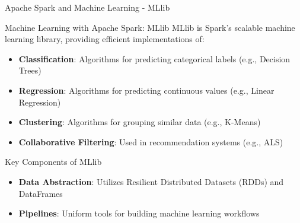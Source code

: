 \documentclass[aspectratio=169]{beamer}
\begin{document}
\begin{frame}[fragile]{Apache Spark and Machine Learning - MLlib}
    \begin{block}{Machine Learning with Apache Spark: MLlib}
        MLlib is Spark's scalable machine learning library, providing efficient implementations of:
        \begin{itemize}
            \item \textbf{Classification}: Algorithms for predicting categorical labels (e.g., Decision Trees)
            \item \textbf{Regression}: Algorithms for predicting continuous values (e.g., Linear Regression)
            \item \textbf{Clustering}: Algorithms for grouping similar data (e.g., K-Means)
            \item \textbf{Collaborative Filtering}: Used in recommendation systems (e.g., ALS)
        \end{itemize}
    \end{block}
    \begin{block}{Key Components of MLlib}
        \begin{itemize}
            \item \textbf{Data Abstraction}: Utilizes Resilient Distributed Datasets (RDDs) and DataFrames
            \item \textbf{Pipelines}: Uniform tools for building machine learning workflows
        \end{itemize}
    \end{block}
\end{frame}
\end{document}

